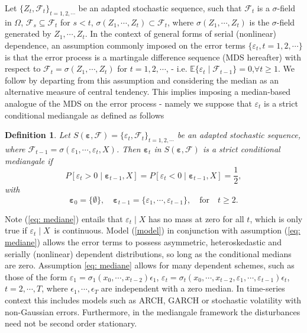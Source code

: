 \documentclass[harvard,11pt]{article}
\newcommand{\E}{\mathbb{E}}
\newtheorem{definition}{Definition}
\begin{document}
 Let $\{Z_t,\mathcal{F}_t\}_{t=1,2,\cdots}$ be an adapted stochastic sequence, such that $\mathcal{F}_t$ is a $\sigma$-field in $\Omega$, $\mathcal{F}_s\subseteq \mathcal{F}_t$ for $s< t$, $\sigma(Z_1,\cdots,Z_t)\subset \mathcal{F}_t$, where $\sigma(Z_1,\cdots,Z_t)$ is the $\sigma$-field generated by $Z_1,\cdots,Z_t$. In the context of general forms of serial (nonlinear) dependence, an assumption commonly imposed on the error terms $\{\varepsilon_t,t=1,2,\cdots\}$ is that the error process is a martingale difference sequence (MDS hereafter) with respect to $\mathcal{F}_t=\sigma(Z_1,\cdots,Z_t)$ for $t=1,2,\cdots$, - i.e. $\E\{\varepsilon_t\mid \mathcal{F}_{t-1}\}=0$,\quad $\forall t\geq1$. We follow \citet{coudin2009finite} by departing from this assumption and considering the median as an alternative measure of central tendency. This implies imposing a median-based analogue of the MDS on the error process - namely we suppose that $\varepsilon_t$ is a strict conditional mediangale as defined as follows
\begin{definition}
Let $S(\bm{\varepsilon},\mathcal{F})=\{\varepsilon_t,\mathcal{F}_{t}\}_{t=1,2,\cdots}$ be an adapted stochastic sequence, where $\mathcal{F}_{t-1}=\sigma(\varepsilon_1,\cdots,\varepsilon_t,X)$. Then $\bm{\varepsilon}_t$ in $S(\bm{\varepsilon},\mathcal{F})$ is a strict conditional mediangale if
\begin{equation}
P[\varepsilon_{t}> 0\mid \bm{{\varepsilon}}_{t-1},X]=P[\varepsilon_{t}<0\mid \bm{\varepsilon}_{t-1},X]=\frac{1}{2},
\label{eq: mediane}
\end{equation}%
with
\[
\bm{\varepsilon}_{0}=\{\emptyset\},\quad\bm{\varepsilon}_{t-1}=\{\varepsilon_1,\cdots,\varepsilon_{t-1}\},\quad\text{for}\quad t\geq2.
\]
\end{definition}

 Note (\ref{eq: mediane}) entails that $\varepsilon _{t}\mid X$ has no mass at zero for all $t$, which is only true if $\varepsilon_{t}\mid X$\ is continuous. Model (\ref{model}) in conjunction with assumption (\ref{eq: mediane}) allows the error terms to possess asymmetric, heteroskedastic and serially (nonlinear) dependent distributions, so long as the conditional medians are zero. Assumption \ref{eq: mediane} allows for many dependent schemes, such as those of the form $\varepsilon_1=\sigma_1(x_0,\cdots,x_{t-2})\epsilon_1$, $\varepsilon_t=\sigma_t(x_0,\cdots,x_{t-2},\varepsilon_1,\cdots,\varepsilon_{t-1})\epsilon_t$, $t=2,\cdots,T$, where $\epsilon_1,\cdots,\epsilon_T$ are independent with a zero median. In time-series context this includes models such as ARCH, GARCH or stochastic volatility with non-Gaussian errors. Furthermore, in the mediangale framework the disturbances need not be second order stationary.
 
\end{document}
